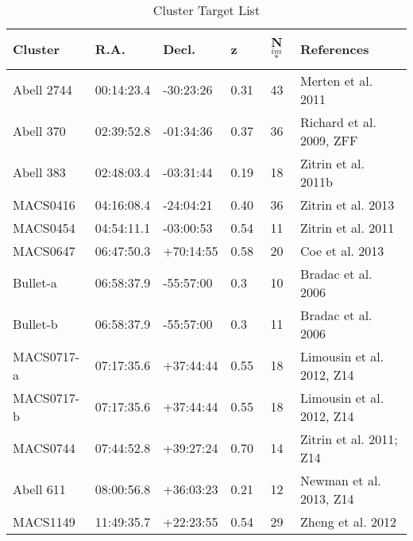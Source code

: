 \begin{table}
\caption{Cluster Target List\label{tab:clusters}}
\begin{tabu}{llllcl}
\toprule
\toprule
Cluster & R.A. & Decl. & z & N$_{im}$ $^*$ & References \\
\midrule
Abell 2744 & 00:14:23.4 & -30:23:26 & 0.31 & 43  & Merten et al. 2011                                         \\
Abell 370  & 02:39:52.8 & -01:34:36 & 0.37 & 36  & Richard et al. 2009, ZFF                                   \\
Abell 383      & 02:48:03.4 & -03:31:44 & 0.19 & 18  & Zitrin et al. 2011b                                        \\
MACS0416   & 04:16:08.4 & -24:04:21 & 0.40 & 36  & Zitrin et al. 2013                                         \\
MACS0454   & 04:54:11.1 & -03:00:53 & 0.54 & 11 & Zitrin et al. 2011                            \\
MACS0647       & 06:47:50.3 & +70:14:55 & 0.58 & 20  & Coe et al. 2013                        \\
Bullet-a       & 06:58:37.9 & -55:57:00 & 0.3  & 10  & Bradac et al. 2006                                           \\
Bullet-b       & 06:58:37.9 & -55:57:00 & 0.3  & 11  & Bradac et al. 2006                                           \\
MACS0717-a     & 07:17:35.6 & +37:44:44 & 0.55 & 18  & Limousin et al. 2012, Z14             \\
MACS0717-b     & 07:17:35.6 & +37:44:44 & 0.55 & 18  & Limousin et al. 2012, Z14             \\
MACS0744       & 07:44:52.8 & +39:27:24 & 0.70 & 14  & Zitrin et al. 2011; Z14                           \\
Abell 611      & 08:00:56.8 & +36:03:23 & 0.21 & 12  & Newman et al. 2013, Z14                                    \\
MACS1149   & 11:49:35.7 & +22:23:55 & 0.54 & 29  & Zheng et al. 2012             \\

\end{tabu}
\end{table}
